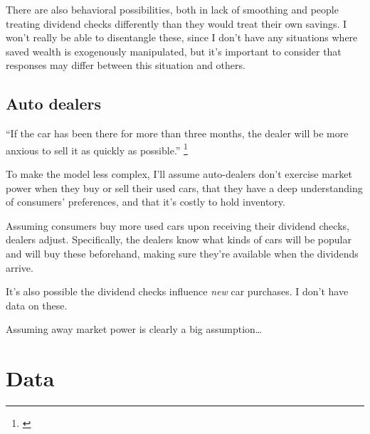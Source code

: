 \documentclass[11pt,letterpaper,oneside]{article}
\begin{document}
There are also behavioral possibilities, both in lack of smoothing and people treating dividend checks differently than they would treat their own savings.
I won't really be able to disentangle these, since I don't have any situations where saved wealth is exogenously manipulated, but it's important to consider that responses may differ between this situation and others.

\subsection{Auto dealers}

``If the car has been there for more than three months, the dealer will be more anxious to sell it as quickly as possible.''%
\footnote{\textcite{usnews_car_deals}} %

To make the model less complex, I'll assume auto-dealers don't exercise market power when they buy or sell their used cars, that they have a deep understanding of consumers' preferences, and that it's costly to hold inventory.

Assuming consumers buy more used cars upon receiving their dividend checks, dealers adjust.
Specifically, the dealers know what kinds of cars will be popular and will buy these beforehand, making sure they're available when the dividends arrive.

It's also possible the dividend checks influence \emph{new} car purchases.
I don't have data on these.

Assuming away market power is clearly a big assumption\ldots


\section{Data}
\end{document}
